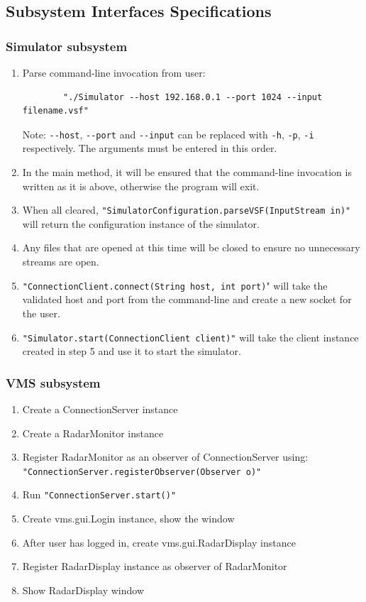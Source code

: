 \documentclass{article}
\begin{document}
\subsection{Subsystem Interfaces Specifications} %

\subsubsection{Simulator subsystem} %

\begin{enumerate}
  \item Parse command-line invocation from user: 
		\begin{verbatim}
		"./Simulator --host 192.168.0.1 --port 1024 --input filename.vsf"
		\end{verbatim}
		Note: \verb|--host|, \verb|--port| and \verb|--input| can be replaced with \verb|-h|, \verb|-p|, \verb|-i| respectively.
		\newline The arguments must be entered in this order.
  \item In the main method, it will be ensured that the command-line invocation is written as it is above, otherwise the program will exit.
  \item When all cleared, \verb|"SimulatorConfiguration.parseVSF(InputStream in)"| will return the configuration instance of the simulator.
  \item Any files that are opened at this time will be closed to ensure no unnecessary streams are open.
	\item \verb|"ConnectionClient.connect(String host, int port)|" will take the validated host and port from the command-line and create a new socket for the user.
	\item \verb|"Simulator.start(ConnectionClient client)"| will take the client instance created in step 5 and use it to start the simulator.	
\end{enumerate}

\subsubsection{VMS subsystem} %

\begin{enumerate}
	\item	Create a ConnectionServer instance
	\item Create a RadarMonitor instance
	\item Register RadarMonitor as an observer of ConnectionServer using:
		\newline \verb|"ConnectionServer.registerObserver(Observer o)"|
	\item Run \verb|"ConnectionServer.start()"|
	\item  Create vms.gui.Login instance, show the window
	\item After user has logged in, create vms.gui.RadarDisplay instance
	\item Register RadarDisplay instance as observer of RadarMonitor
	\item Show RadarDisplay window
\end{enumerate}
\end{document}
